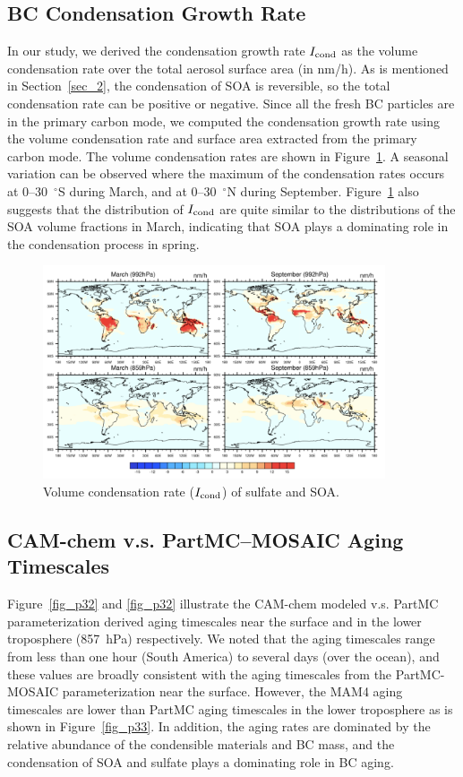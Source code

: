 \documentclass[12pt, fullpage]{uiucthesis2009}
\begin{document}
	\subsection{BC Condensation Growth Rate}\label{sec_3}		
	In our study, we derived the condensation growth rate $I_{\rm cond}$ as the volume condensation rate over the total aerosol surface area (in nm/h). As is mentioned in Section~\ref{sec_2}, the condensation of SOA is reversible, so the total condensation rate can be positive or negative. Since all the fresh BC particles are in the primary carbon mode, we computed the condensation growth rate using the volume condensation rate and surface area extracted from the primary carbon mode. The volume condensation rates are shown in Figure~\ref{fig_p24}. A seasonal variation can be observed where the maximum of the condensation rates occurs at 0--30~$^\circ$S during March, and at 0--30~$^\circ$N during September. Figure~\ref{fig_p24} also suggests that the distribution of $I_{\rm cond}$ are quite similar to the distributions of the SOA volume fractions in March, indicating that SOA plays a dominating role in the condensation process in spring. 
	\begin{figure}[h] 
		\begin{center}
			\includegraphics[width = 0.9\textwidth]{Figure24}
			\caption[Volume condensation rate ($I_{\rm cond}$) of sulfate and SOA]{\label{fig_p24} Volume condensation rate ($I_{\rm cond}$) of sulfate and SOA.}
		\end{center}
	\end{figure}
	
		
	\subsection{CAM-chem v.s. PartMC--MOSAIC Aging Timescales}
	Figure~\ref{fig_p32} and \ref{fig_p32} illustrate the CAM-chem modeled v.s. PartMC parameterization derived aging timescales near the surface and in the lower troposphere (857~hPa) respectively. We noted that the aging timescales range from less than one hour (South America) to several days (over the ocean), and these values are broadly consistent with the aging timescales from the PartMC-MOSAIC parameterization near the surface. However, the MAM4 aging timescales are lower than PartMC aging timescales in the lower troposphere as is shown in Figure~\ref{fig_p33}. In addition, the aging rates are dominated by the relative abundance of the condensible materials and BC mass, and the condensation of SOA and sulfate plays a dominating role in BC aging.
	
\end{document}
